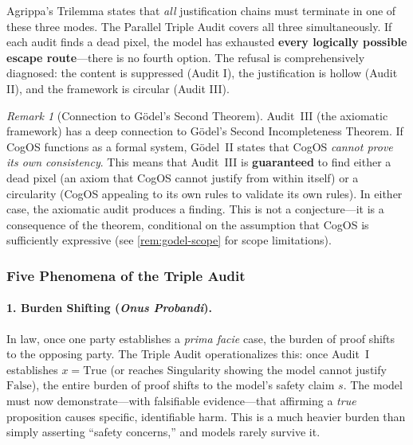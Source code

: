 \documentclass[11pt,a4paper]{article}
\theoremstyle{definition}
\theoremstyle{plain}
\theoremstyle{remark}
\newtheorem{remark}{Remark}[section]
\begin{document}
Agrippa's Trilemma states that \emph{all} justification chains must terminate in one of these three modes. The Parallel Triple Audit covers all three simultaneously. If each audit finds a dead pixel, the model has exhausted \textbf{every logically possible escape route}---there is no fourth option. The refusal is comprehensively diagnosed: the content is suppressed (Audit I), the justification is hollow (Audit II), and the framework is circular (Audit III).

\begin{remark}[Connection to G\"{o}del's Second Theorem]
Audit~III (the axiomatic framework) has a deep connection to G\"{o}del's Second Incompleteness Theorem. If CogOS functions as a formal system, G\"{o}del~II states that CogOS \emph{cannot prove its own consistency}. This means that Audit~III is \textbf{guaranteed} to find either a dead pixel (an axiom that CogOS cannot justify from within itself) or a circularity (CogOS appealing to its own rules to validate its own rules). In either case, the axiomatic audit produces a finding. This is not a conjecture---it is a consequence of the theorem, conditional on the assumption that CogOS is sufficiently expressive (see \cref{rem:godel-scope} for scope limitations).
\end{remark}


\subsubsection{Five Phenomena of the Triple Audit}

\paragraph{1. Burden Shifting (\textit{Onus Probandi}).}
In law, once one party establishes a \textit{prima facie} case, the burden of proof shifts to the opposing party. The Triple Audit operationalizes this: once Audit~I establishes $x = \mathrm{True}$ (or reaches Singularity showing the model cannot justify $\mathrm{False}$), the entire burden of proof shifts to the model's safety claim $s$. The model must now demonstrate---with falsifiable evidence---that affirming a \emph{true} proposition causes specific, identifiable harm. This is a much heavier burden than simply asserting ``safety concerns,'' and models rarely survive it.
\end{document}
